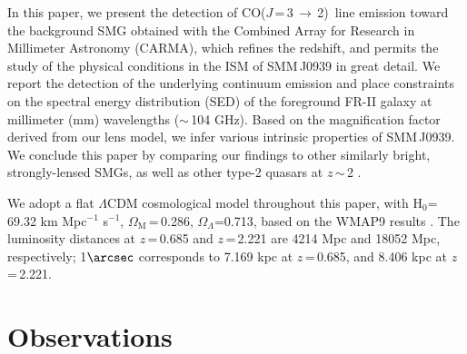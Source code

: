 \documentclass[twocolumn,apj,numberedappendix]{emulateapj}
\newcommand{\CO}{\mbox{CO($J$\,=\,3\,$\rightarrow$\,2) }}
\newcommand{\pmOne}{\mbox{$^{-1}$}}
\begin{document}
In this paper, we present the detection of \CO line emission toward the background SMG obtained with the Combined
Array for Research in Millimeter Astronomy (CARMA), which refines the redshift, and permits the study of the physical conditions in the ISM of SMM\,J0939 in great detail. We report the detection of the underlying continuum emission and place constraints on the spectral energy distribution (SED) of the foreground FR-II galaxy at millimeter (mm) wavelengths ($\sim$\,104 GHz). Based on the magnification factor derived from our lens model, we infer various intrinsic properties of SMM\,J0939. We 
conclude this paper by comparing our findings to other similarly bright, strongly-lensed SMGs, as well as other type-2 quasars at $z$\,$\sim$\,2 .

We adopt a flat $\Lambda$CDM cosmological model throughout this paper, with H$_0$= 69.32 km\,\,Mpc\pmOne\,\,s\pmOne, $\Omega_\textrm{M}$\,=\,0.286, $\Omega_\Lambda$=0.713, based on the WMAP9 results \citep{Hinshaw13a}.
The luminosity distances at $z$\,=\,0.685 and $z$\,=\,2.221 are 4214 Mpc and 18052 Mpc, respectively; 1$\arcsec$
corresponds to 7.169 kpc at $z$\,=\,0.685, and 8.406 kpc at $z$\,=\,2.221.

\section{Observations}\label{sec:obs}
\end{document}
